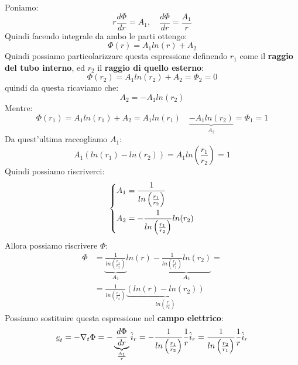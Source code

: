 Poniamo:
\begin{equation*}
    r \frac{d \Phi}{dr} = A_1, \quad \frac{d \Phi}{dr} = \frac{A_1}{r }
\end{equation*}
Quindi facendo integrale da ambo le parti ottengo:
\begin{equation*}
    \Phi (r) = A_1 ln(r) + A_2
\end{equation*}
Quindi possiamo particolarizzare questa espressione definendo $r_1$ come il \textbf{raggio del tubo interno}, ed $r_2$ il \textbf{raggio di quello esterno}:
\begin{equation*}
        \Phi (r_2) = A_1 ln(r_2) + A_2 = \Phi_2 = 0
\end{equation*}
quindi da questa ricaviamo che:
\begin{equation*}
    A_2 = - A_1 ln(r_2)
\end{equation*}
Mentre:
\begin{equation*}
        \Phi (r_1) = A_1 ln(r_1) + A_2 = A_1 ln(r_1) \quad \underbrace{- A_1 ln(r_2)}_{A_2}  = \Phi_1 = 1
\end{equation*}
Da quest'ultima raccogliamo $A_1$:
\begin{equation*}
    A_1(ln(r_1) - ln(r_2)) = A_1 ln\left(\frac{r_1}{r_2}\right) = 1
\end{equation*}
Quindi possiamo riscriverci:
\begin{equation*}
    \begin{dcases}
        A_1 = \frac{1}{ln\left(\frac{r_1}{r_2}\right)}\\
        A_2 = -\frac{1}{ln\left(\frac{r_1}{r_2}\right)} ln(r_2)
    \end{dcases}
\end{equation*}
Allora possiamo riscrivere $\Phi$:
\begin{equation*}
\begin{aligned}
    \Phi &= \underbrace{\frac{1}{ln\left(\frac{r_1}{r_2}\right)}}_{A_1} ln(r) - \underbrace{\frac{1}{ln\left(\frac{r_1}{r_2}\right)} ln(r_2)}_{A_2} =\\ 
    &= \frac{1}{ln\left(\frac{r_1}{r_2}\right)}\underbrace{\left(ln(r) - ln(r_2)\right)}_{ln\left(\frac{r}{r_2}\right)}
\end{aligned}
\end{equation*}
Possiamo sostituire questa espressione nel \textbf{campo elettrico}:
\begin{equation*}
    \underline{e}_t = - \nabla_t \Phi = - \underbrace{\frac{d\Phi}{dr}}_{\frac{A_1}{r}} \hat{i}_r =  -\frac{1}{ln\left(\frac{r_1}{r_2}\right)} \frac{1}{r} \hat{i}_r = \frac{1}{ln\left(\frac{r_2}{r_1}\right)} \frac{1}{r} \hat{i}_r
\end{equation*}
